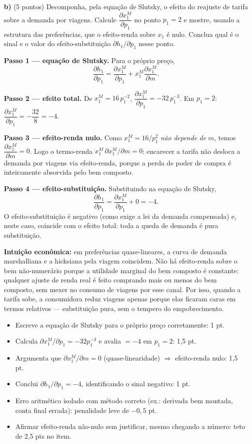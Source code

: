 \textbf{b)} (5 pontos) Decomponha, pela equação de Slutsky, o efeito do reajuste de tarifa sobre a demanda por viagens. Calcule $\dfrac{\partial x_1^{M}}{\partial p_1}$ no ponto $p_1=2$ e mostre, usando a estrutura das preferências, que o efeito-renda sobre $x_1$ é nulo. Conclua qual é o sinal e o valor do efeito-substituição $\partial h_1/\partial p_1$ nesse ponto.
\resolucaobox{7.6cm}
\begin{solucao}
\textbf{Passo 1 — equação de Slutsky.} Para o próprio preço,
\[
\frac{\partial h_1}{\partial p_1}=\frac{\partial x_1^{M}}{\partial p_1}+x_1^{M}\frac{\partial x_1^{M}}{\partial m}.
\]

\textbf{Passo 2 — efeito total.} De $x_1^{M}=16\,p_1^{-2}$, $\dfrac{\partial x_1^{M}}{\partial p_1}=-32\,p_1^{-3}$. Em $p_1=2$: $\dfrac{\partial x_1^{M}}{\partial p_1}=-\dfrac{32}{8}=-4.$

\textbf{Passo 3 — efeito-renda nulo.} Como $x_1^{M}=16/p_1^{2}$ \emph{não depende de} $m$, temos $\dfrac{\partial x_1^{M}}{\partial m}=0$. Logo o termo-renda $x_1^{M}\,\partial x_1^{M}/\partial m=0$: encarecer a tarifa não desloca a demanda por viagens via efeito-renda, porque a perda de poder de compra é inteiramente absorvida pelo bem composto.

\textbf{Passo 4 — efeito-substituição.} Substituindo na equação de Slutsky,
\[
\frac{\partial h_1}{\partial p_1}=\frac{\partial x_1^{M}}{\partial p_1}+0=-4.
\]
O efeito-substituição é negativo (como exige a lei da demanda compensada) e, neste caso, coincide com o efeito total: toda a queda de demanda é pura substituição.

\textbf{Intuição econômica:} em preferências quase-lineares, a curva de demanda marshalliana e a hicksiana pela viagem coincidem. Não há efeito-renda sobre o bem não-numerário porque a utilidade marginal do bem composto é constante: qualquer ajuste de renda real é feito comprando mais ou menos do bem composto, sem mexer no consumo de viagens por esse canal. Por isso, quando a tarifa sobe, a consumidora reduz viagens apenas porque elas ficaram caras em termos relativos — substituição pura, sem o tempero do empobrecimento.
\rubricalabel
\begin{itemize}
\item Escreve a equação de Slutsky para o próprio preço corretamente: 1 pt.
\item Calcula $\partial x_1^{M}/\partial p_1=-32 p_1^{-3}$ e avalia $=-4$ em $p_1=2$: 1{,}5 pt.
\item Argumenta que $\partial x_1^{M}/\partial m=0$ (quase-linearidade) $\Rightarrow$ efeito-renda nulo: 1{,}5 pt.
\item Conclui $\partial h_1/\partial p_1=-4$, identificando o sinal negativo: 1 pt.
\item Erro aritmético isolado com método correto (ex.: derivada bem montada, conta final errada): penalidade leve de $-0{,}5$ pt.
\item Afirmar efeito-renda não-nulo sem justificar, mesmo chegando a número: teto de 2{,}5 pts no item.
\end{itemize}
\end{solucao}


